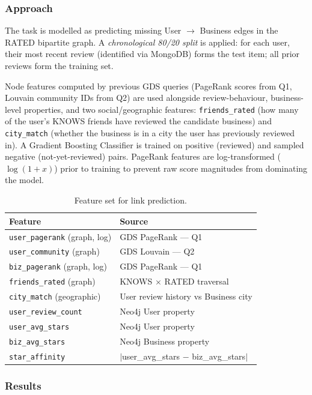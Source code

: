 \documentclass[11pt,a4paper]{article}
\begin{document}
\subsubsection*{Approach}

The task is modelled as predicting missing User $\to$ Business edges in the
RATED bipartite graph.  A \emph{chronological 80/20 split} is applied: for each
user, their most recent review (identified via MongoDB) forms the test item; all
prior reviews form the training set.

Node features computed by previous GDS queries (PageRank scores from Q1,
Louvain community IDs from Q2) are used alongside review-behaviour,
business-level properties, and two social/geographic features:
\texttt{friends\_rated} (how many of the user's KNOWS friends have reviewed
the candidate business) and \texttt{city\_match} (whether the business is in
a city the user has previously reviewed in).
A Gradient Boosting Classifier is trained on
positive (reviewed) and sampled negative (not-yet-reviewed) pairs.
PageRank features are log-transformed ($\log(1 + x)$) prior to training to
prevent raw score magnitudes from dominating the model.

\begin{table}[H]
\centering
\caption{Feature set for link prediction.}
\begin{tabular}{ll}
\toprule
\textbf{Feature} & \textbf{Source}\\
\midrule
\texttt{user\_pagerank} (graph, log) & GDS PageRank --- Q1\\
\texttt{user\_community} (graph) & GDS Louvain --- Q2\\
\texttt{biz\_pagerank} (graph, log) & GDS PageRank --- Q1\\
\texttt{friends\_rated} (graph) & KNOWS $\times$ RATED traversal\\
\texttt{city\_match} (geographic) & User review history vs Business city\\
\texttt{user\_review\_count} & Neo4j User property\\
\texttt{user\_avg\_stars} & Neo4j User property\\
\texttt{biz\_avg\_stars} & Neo4j Business property\\
\texttt{star\_affinity} & $|$user\_avg\_stars $-$ biz\_avg\_stars$|$\\
\bottomrule
\end{tabular}
\end{table}

\subsubsection*{Results}
\end{document}
